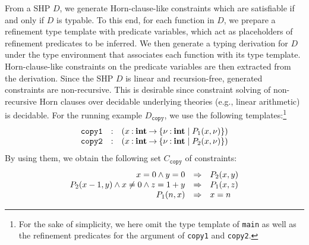 From a SHP \(D\), we generate Horn-clause-like constraints which are
satisfiable if and only if \(D\) is typable.  To this end, for each
function in \(D\), we prepare a refinement type template with predicate
variables, which act as placeholders of refinement predicates to be
inferred.  We then generate a typing derivation for \(D\) under the type
environment that associates each function with its type template.
Horn-clause-like constraints on the predicate variables are then
extracted from the derivation.  Since the SHP \(D\) is linear and
recursion-free, generated constraints are non-recursive.  This is
desirable since constraint solving of non-recursive Horn clauses over
decidable underlying theories (e.g., linear arithmetic) is decidable.
For the running example \(D_{\texttt{copy}}\), we use the following
templates:\footnote{For the sake of simplicity, we here omit the type
template of \texttt{main} as well as the refinement predicates for the
argument of \texttt{copy1} and \texttt{copy2}.}
\[
\begin{array}{rcl}
\texttt{copy1}&\mathbin{:}&(x\mathbin{:}{\mathbf{int}}\mathbin{\rightarrow}{\{{\nu\mathbin{:}\mathbf{int} \mid P_1(x,\nu)}\}}) \\
\texttt{copy2}&\mathbin{:}&(x\mathbin{:}{\mathbf{int}}\mathbin{\rightarrow}{\{{\nu\mathbin{:}\mathbf{int} \mid P_2(x,\nu)}\}})
\end{array}
\]
By using them, we obtain the following set \(C_{\texttt{copy}}\) of
constraints:
\[
\begin{array}{rcl}
x=0 \land y=0 &\Rightarrow& P_2(x,y) \\
P_2(x-1,y) \land x\neq0 \land z=1+y &\Rightarrow& P_1(x,z) \\
P_1(n,x) &\Rightarrow& x=n
\end{array}
\]


